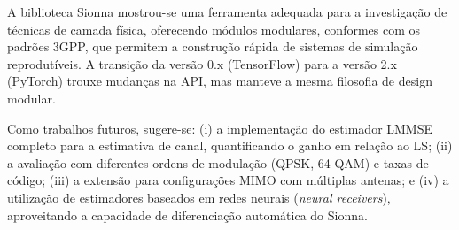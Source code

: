 \documentclass[conference]{IEEEtran}
\begin{document}
A biblioteca Sionna mostrou-se uma ferramenta adequada para a investigação de técnicas de camada física, oferecendo módulos modulares, conformes com os padrões 3GPP, que permitem a construção rápida de sistemas de simulação reprodutíveis. A transição da versão 0.x (TensorFlow) para a versão 2.x (PyTorch) trouxe mudanças na API, mas manteve a mesma filosofia de design modular.

Como trabalhos futuros, sugere-se: (i) a implementação do estimador LMMSE completo para a estimativa de canal, quantificando o ganho em relação ao LS; (ii) a avaliação com diferentes ordens de modulação (QPSK, 64-QAM) e taxas de código; (iii) a extensão para configurações MIMO com múltiplas antenas; e (iv) a utilização de estimadores baseados em redes neurais (\textit{neural receivers}), aproveitando a capacidade de diferenciação automática do Sionna.
\end{document}
